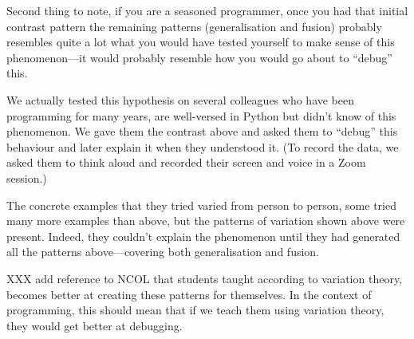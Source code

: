 Second thing to note, if you are a seasoned programmer, once you had that 
initial contrast pattern the remaining patterns (generalisation and fusion) 
probably resembles quite a lot what you would have tested yourself to make 
sense of this phenomenon---it would probably resemble how you would go about to 
\enquote{debug} this.

We actually tested this hypothesis on several colleagues who have been 
programming for many years, are well-versed in Python but didn't know of this 
phenomenon.
We gave them the contrast above and asked them to \enquote{debug} this 
behaviour and later explain it when they understood it.
(To record the data, we asked them to think aloud and recorded their screen and 
voice in a Zoom session.)

The concrete examples that they tried varied from person to person, some tried 
many more examples than above, but the patterns of variation shown above were 
present.
Indeed, they couldn't explain the phenomenon until they had generated all the 
patterns above---covering both generalisation and fusion.

XXX add reference to NCOL that students taught according to variation theory, 
becomes better at creating these patterns for themselves.
In the context of programming, this should mean that if we teach them using 
variation theory, they would get better at debugging.

